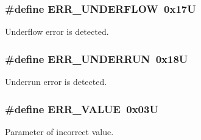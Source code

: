 \subsubsection[{\texorpdfstring{E\+R\+R\+\_\+\+U\+N\+D\+E\+R\+F\+L\+OW}{ERR_UNDERFLOW}}]{\setlength{\rightskip}{0pt plus 5cm}\#define E\+R\+R\+\_\+\+U\+N\+D\+E\+R\+F\+L\+OW~0x17U}\hypertarget{group___p_e___error__module_ga0e0f76be42ac68519b962029a71317ed}{}\label{group___p_e___error__module_ga0e0f76be42ac68519b962029a71317ed}
Underflow error is detected. 
\subsubsection[{\texorpdfstring{E\+R\+R\+\_\+\+U\+N\+D\+E\+R\+R\+UN}{ERR_UNDERRUN}}]{\setlength{\rightskip}{0pt plus 5cm}\#define E\+R\+R\+\_\+\+U\+N\+D\+E\+R\+R\+UN~0x18U}\hypertarget{group___p_e___error__module_gad63d6a13b7456014efbf4eeeb3c3ace4}{}\label{group___p_e___error__module_gad63d6a13b7456014efbf4eeeb3c3ace4}
Underrun error is detected. 
\subsubsection[{\texorpdfstring{E\+R\+R\+\_\+\+V\+A\+L\+UE}{ERR_VALUE}}]{\setlength{\rightskip}{0pt plus 5cm}\#define E\+R\+R\+\_\+\+V\+A\+L\+UE~0x03U}\hypertarget{group___p_e___error__module_ga5bb2ede249f173e549ddcd676f61caf0}{}\label{group___p_e___error__module_ga5bb2ede249f173e549ddcd676f61caf0}
Parameter of incorrect value. 
